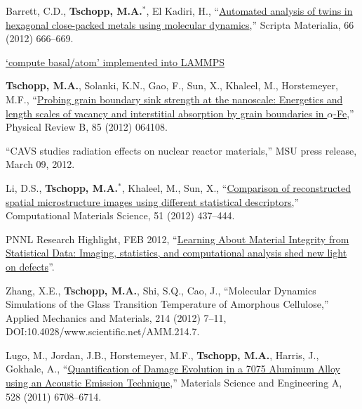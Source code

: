 \begin{cvlist}
\item
{Barrett, C.D.}, \textbf{Tschopp, M.A.}$^\ast$, El Kadiri, H., ``\href{http://dx.DOI.org/10.1016/j.scriptamat.2012.01.034}{Automated analysis of twins in hexagonal close-packed metals using molecular dynamics},'' Scripta Materialia, 66 (2012) 666--669.
\begin{list2}
\item[$\star$] \href{http://lammps.sandia.gov/doc/compute_basal_atom.html}{`compute basal/atom' implemented into LAMMPS}
\end{list2}

\item
\textbf{Tschopp, M.A.}, Solanki, K.N., Gao, F., Sun, X., Khaleel, M., Horstemeyer, M.F., ``\href{http://dx.DOI.org/10.1103/PhysRevB.85.064108}{Probing grain boundary sink strength at the nanoscale: Energetics and length scales of vacancy and interstitial absorption by grain boundaries in $\alpha$-Fe},'' Physical Review B, 85 (2012) 064108.
\begin{list2}
\item[$\star$] ``{CAVS studies radiation effects on nuclear reactor materials},'' MSU press release, March 09, 2012.
\end{list2}

\item
Li, D.S., \textbf{Tschopp, M.A.}$^\ast$, Khaleel, M., Sun, X., ``\href{http://dx.DOI.org/10.1016/j.commatsci.2011.07.056}{Comparison of reconstructed spatial microstructure images using different statistical descriptors},'' Computational Materials Science, 51 (2012) 437--444.
\begin{list2}
\item[$\star$] PNNL Research Highlight, FEB 2012, ``\href{http://www.pnnl.gov/science/highlights/highlight.asp?id=1115}{Learning About Material Integrity from Statistical Data: Imaging, statistics, and computational analysis shed new light on defects}''.
\end{list2}

\item
{Zhang, X.E.}, \textbf{Tschopp, M.A.}, Shi, S.Q., Cao, J., ``Molecular Dynamics Simulations of the Glass Transition Temperature of Amorphous Cellulose,'' Applied Mechanics and Materials, 214 (2012) 7--11, DOI:10.4028/www.scientific.net/AMM.214.7.

\item
{Lugo, M.}, Jordan, J.B., Horstemeyer, M.F., \textbf{Tschopp, M.A.}, Harris, J., Gokhale, A., ``\href{http://dx.DOI.org/10.1016/j.msea.2011.05.017}{Quantification of Damage Evolution in a 7075 Aluminum Alloy using an Acoustic Emission Technique},'' Materials Science and Engineering A, 528 (2011) 6708--6714. 


\end{cvlist}
